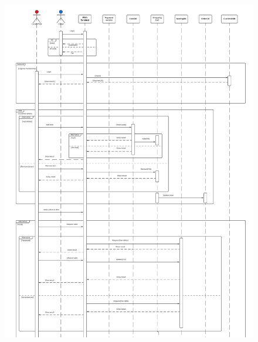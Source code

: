 \documentclass[12pt, a4paper]{article}
\theoremstyle{styleth}
\theoremstyle{styledef}
\begin{document}
\begin{figure}
	\centering
	\includegraphics[width=16.5cm]{Screenshot 2022-03-05 182607.png}
	\label{fig:seqdiag1}
\end{figure}
\end{document}
